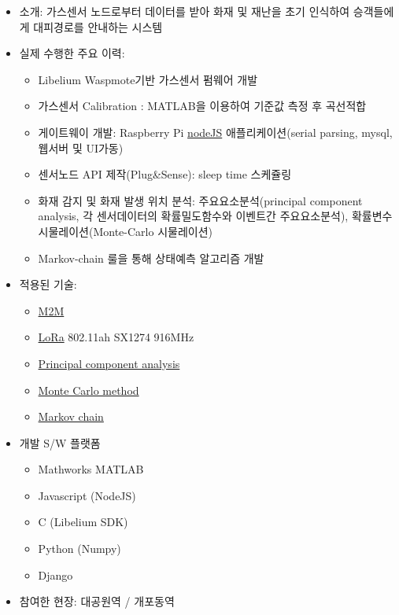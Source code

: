 \documentclass[10pt,a4paper,ragged2e]{altacv}
\begin{document}
\begin{fullwidth}
\divider


\begin{itemize}
\item
  소개: 가스센서 노드로부터 데이터를 받아 화재 및 재난을 초기 인식하여 승객들에게 대피경로를 안내하는 시스템
\item
  실제 수행한 주요 이력:
  \begin{itemize}
    \item Libelium Waspmote기반 가스센서 펌웨어 개발
    \item 가스센서 Calibration : MATLAB을 이용하여 기준값 측정 후 곡선적합
    \item 게이트웨이 개발: Raspberry Pi \href{https://nodejs.org}{nodeJS} 애플리케이션(serial parsing, mysql, 웹서버 및 UI가동)
    \item 센서노드 API 제작(Plug\&Sense): sleep time 스케쥴링
    \item 화재 감지 및 화재 발생 위치 분석: 주요요소분석(principal component analysis, 각 센서데이터의 확률밀도함수와 이벤트간 주요요소분석), 확률변수시물레이션(Monte-Carlo 시물레이션)
    \item Markov-chain 룰을 통해 상태예측 알고리즘 개발
  \end{itemize}
\item 적용된 기술:
  \begin{itemize} 
    \item \href{https://en.wikipedia.org/wiki/Machine_to_machine}{M2M}
    \item \href{https://lora-alliance.org/}{LoRa} 802.11ah SX1274 916MHz
    \item \href{https://en.wikipedia.org/wiki/Principal_component_analysis}{Principal component analysis} 
    \item \href{https://en.wikipedia.org/wiki/Monte_Carlo_method}{Monte Carlo method}
    \item \href{https://en.wikipedia.org/wiki/Markov_chain}{Markov chain}
  \end{itemize}
\item 개발 S/W 플랫폼
  \begin{itemize}
    \item Mathworks MATLAB
    \item Javascript (NodeJS)
    \item C (Libelium SDK)
    \item Python (Numpy)
    \item Django
  \end{itemize}
\item 참여한 현장: 대공원역 / 개포동역
\end{itemize}


\end{fullwidth}
\end{document}
